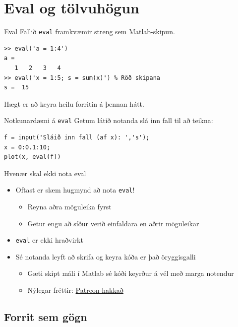 \documentclass{beamer}
\begin{document}
\section{Eval og tölvuhögun}

\begin{frame}[fragile]{Eval}
Fallið \texttt{eval} framkvæmir streng sem Matlab-skipun.

\begin{verbatim}
>> eval('a = 1:4')
a =
   1   2   3   4
>> eval('x = 1:5; s = sum(x)') % Röð skipana
s =  15
\end{verbatim}

Hægt er að keyra heilu forritin á þennan hátt.
\end{frame}

\begin{frame}[fragile]{Notkunardæmi á \texttt{eval}}
Getum látið notanda slá inn fall til að teikna:
\begin{verbatim}
f = input('Sláið inn fall (af x): ','s');
x = 0:0.1:10;
plot(x, eval(f))
\end{verbatim}
\end{frame}

\begin{frame}{Hvenær skal ekki nota eval}
\begin{itemize}
 \item Oftast er slæm hugmynd að nota \texttt{eval}!
 \begin{itemize}
  \item Reyna aðra möguleika fyrst
  \item Getur engu að síður verið einfaldara en aðrir möguleikar
 \end{itemize}
 \item \texttt{eval} er ekki hraðvirkt
 \item Sé notanda leyft að skrifa og keyra kóða er það öryggisgalli
 \begin{itemize}
  \item Gæti skipt máli í Matlab sé kóði keyrður á vél með marga notendur
  \item Nýlegar fréttir: \href{http://labs.detectify.com/post/130332638391/how-patreon-got-hacked-publicly-exposed-werkzeug}{Patreon hakkað}
 \end{itemize}
\end{itemize}
\end{frame}

\subsection{Forrit sem gögn}
\end{document}
